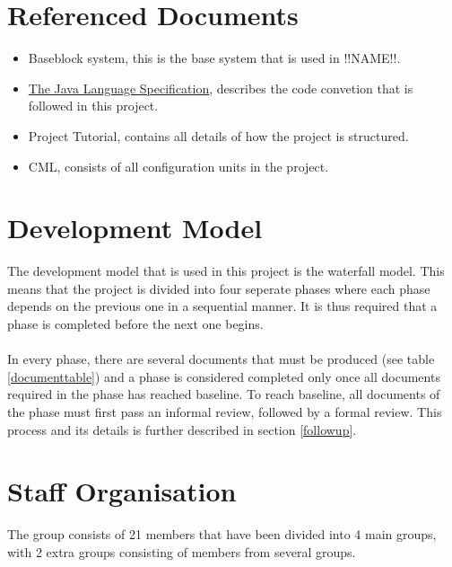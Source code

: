 \documentclass{article}
\begin{document}
\section{Referenced Documents}
    \begin{itemize}
        \item Baseblock system,  this is the base system that is used in !!NAME!!.
        \item \href{https://docs.oracle.com/javase/specs/jls/se11/html/index.html}{The Java Language Specification}, describes the code convetion that is followed in this project.
        \item \label{PH} Project Tutorial, contains all details of how the project is structured.
        \item CML, consists of all configuration units in the project.
    \end{itemize}
    

\section{Development Model} %
    The development model that is used in this project is the waterfall model. This
    means that the project is divided into four seperate phases where each phase depends
    on the previous one in a sequential manner. It is thus required that a phase is
    completed before the next one begins.
    \\ \\
    In every phase, there are several documents that must be produced (see table \ref{documenttable}) and a phase
    is considered completed only once all documents required in the phase has reached baseline.
    To reach baseline, all documents of the phase must first pass an informal review, 
    followed by a formal review. This process and its details is further described in section \ref{followup}.
    
\section{Staff Organisation} %
    The group consists of 21 members that have been divided into 4 main groups, with 2 extra groups consisting of members from several groups. 
    
\end{document}
